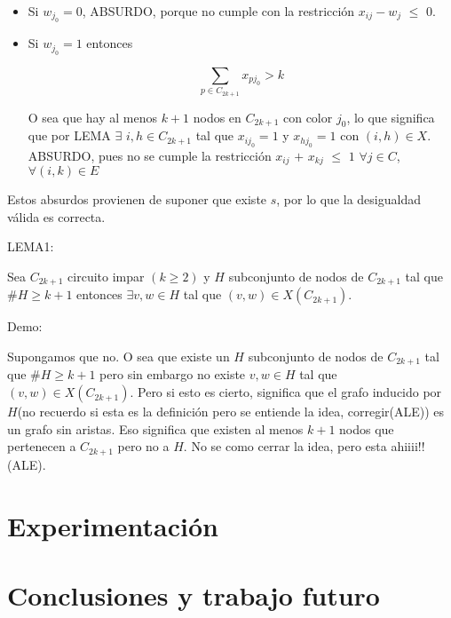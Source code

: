\documentclass[a4paper]{article}
\begin{document}
\begin{itemize}

	\item Si $w_{j_0} = 0$, ABSURDO, porque no cumple con la restricción $x_{ij} - w_j$ $\leq$ $0$.
	
	\item Si $w_{j_0} = 1$ entonces
	
	\begin{equation*}
	\sum_{p \in C_{2k+1}} x_{pj_0} > k
	\end{equation*}

	O sea que hay al menos $k+1$ nodos en $C_{2k+1}$ con color $j_0$, lo que significa que por LEMA $\exists$ $i,h \in C_{2k+1}$ tal que $x_{ij_0} =1$ y $x_{hj_0} =1$ con $(i,h) \in X$.
	ABSURDO, pues no se cumple la restricción $x_{ij}$ $+$ $x_{kj}$ $\leq$ $1$   $\forall j \in C$, $\forall (i,k) \in E$
\end{itemize}

Estos absurdos provienen de suponer que existe $s$, por lo que la desigualdad válida es correcta.

LEMA1:

Sea $C_{2k+1}$ circuito impar $(k\geq 2)$ y $H$ subconjunto de nodos de $C_{2k+1}$ tal que $\# H \geq k+1$ entonces $\exists v,w \in H$ tal que $(v,w) \in X(C_{2k+1})$.

Demo:

Supongamos que no. O sea que existe un $H$ subconjunto de nodos de $C_{2k+1}$ tal que $\# H \geq k+1$ pero sin embargo no existe $v,w \in H$ tal que $(v,w) \in X(C_{2k+1})$. Pero si esto es cierto, significa que el grafo inducido por $H$(no recuerdo si esta es la definición pero se entiende la idea, corregir(ALE)) es un grafo sin aristas. Eso significa que existen al menos $k+1$ nodos que pertenecen a $C_{2k+1}$ pero no a $H$. No se como cerrar la idea, pero esta ahiiii!!(ALE).


\newpage

\section{Experimentación}

\newpage

\section{Conclusiones y trabajo futuro} 
\end{document}
